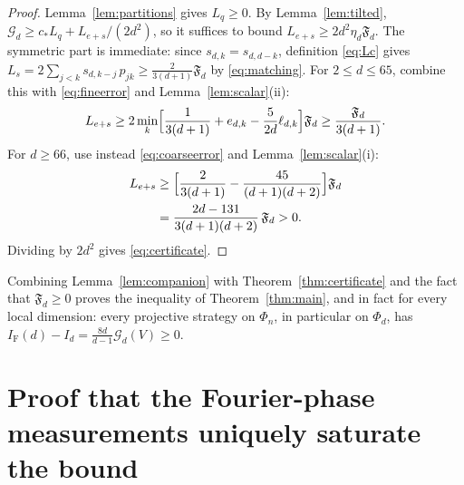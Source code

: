 \documentclass[aps,prl,reprint,superscriptaddress,longbibliography,floatfix,raggedbottom]{revtex4-2}
\newcommand{\IF}{I_{\mathrm F}}
\newcommand{\cstar}{c_*}
\newcommand{\Fd}{\mathfrak F_d}
\newcommand{\Gd}{\mathcal G_d}
\begin{document}
\begin{proof}
Lemma~\ref{lem:partitions} gives $L_q\ge0$. By
Lemma~\ref{lem:tilted},
$\Gd\ge\cstar L_q+L_{e+s}/(2d^2)$, so it suffices to bound
$L_{e+s}\ge2d^2\eta_d\Fd$. The symmetric part is immediate: since
$s_{d,k}=s_{d,d-k}$, definition \eqref{eq:Lc} gives
$L_s=2\sum_{j<k}s_{d,k-j}\,p_{jk}\ge\tfrac2{3(d+1)}\Fd$ by
\eqref{eq:matching}. For $2\le d\le65$, combine this with
\eqref{eq:fineerror} and Lemma~\ref{lem:scalar}(ii):
\[
L_{e+s}\ge2\min_k\Bigl[\frac1{3(d+1)}+e_{d,k}
-\frac5{2d}\ell_{d,k}\Bigr]\Fd
\ge\frac{\Fd}{3(d+1)} .
\]
For $d\ge66$, use instead \eqref{eq:coarseerror} and
Lemma~\ref{lem:scalar}(i):
\[
\begin{split}
L_{e+s}&\ge\Bigl[\frac2{3(d+1)}-\frac{45}{(d+1)(d+2)}\Bigr]\Fd\\
&=\frac{2d-131}{3(d+1)(d+2)}\,\Fd>0 .
\end{split}
\]
Dividing by $2d^2$ gives \eqref{eq:certificate}.
\end{proof}

Combining Lemma~\ref{lem:companion} with
Theorem~\ref{thm:certificate} and the fact that $\Fd \geq 0$ proves the inequality of
Theorem~\ref{thm:main}, and in fact for every local dimension: every
projective strategy on $\Phi_n$, in particular on $\Phi_d$, has
$\IF(d)-I_d=\tfrac{8d}{d-1}\Gd(V)\ge0$.

\section{Proof that the Fourier-phase measurements uniquely saturate the bound}
\label{sec:equality}
\end{document}
